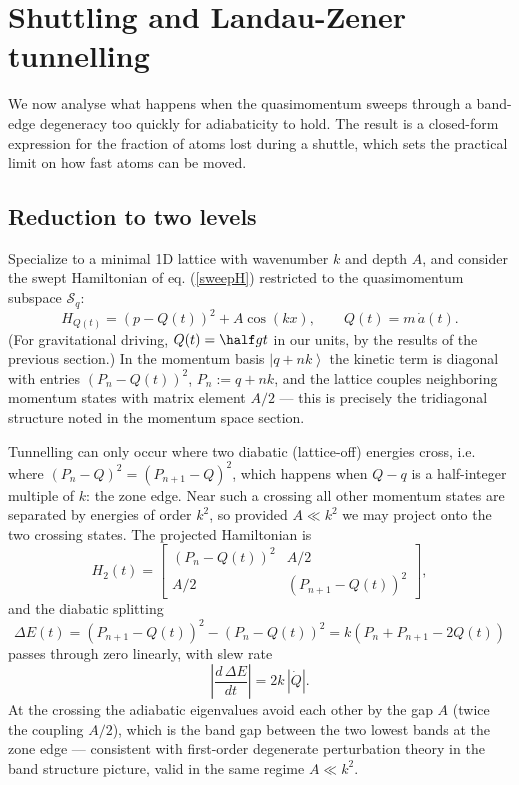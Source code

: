 
\section{Shuttling and Landau-Zener tunnelling}

We now analyse what happens when the quasimomentum sweeps through a
band-edge degeneracy too quickly for adiabaticity to hold.  The result is a
closed-form expression for the fraction of atoms lost during a shuttle,
which sets the practical limit on how fast atoms can be moved.

\subsection{Reduction to two levels}

Specialize to a minimal 1D lattice with wavenumber $k$ and depth $A$, and
consider the swept Hamiltonian of eq. (\ref{sweepH}) restricted to the
quasimomentum subspace $\mathcal{S}_q$:
$$H_{Q(t)} = \left(p - Q(t)\right)^2 + A\cos(kx), \qquad Q(t) = m\,\dot a(t).$$
(For gravitational driving, $Q(t) = \half g t$ in our units, by the results of
the previous section.)  In the momentum basis $\left|q + nk\right>$ the kinetic
term is diagonal with entries $\left(P_n - Q(t)\right)^2$, $P_n := q + nk$, and
the lattice couples neighboring momentum states with matrix element $A/2$ ---
this is precisely the tridiagonal structure noted in the momentum space section.

Tunnelling can only occur where two diabatic (lattice-off) energies cross, i.e.
where $\left(P_n - Q\right)^2 = \left(P_{n+1} - Q\right)^2$, which happens when
$Q - q$ is a half-integer multiple of $k$: the zone edge.  Near such a crossing
all other momentum states are separated by energies of order $k^2$, so provided
$A \ll k^2$ we may project onto the two crossing states.  The projected
Hamiltonian is
$$H_2(t) = \begin{bmatrix} \left(P_n - Q(t)\right)^2 & A/2 \\ A/2 &
\left(P_{n+1} - Q(t)\right)^2 \end{bmatrix},$$
and the diabatic splitting
$$\Delta E(t) = \left(P_{n+1}-Q(t)\right)^2 - \left(P_n-Q(t)\right)^2
= k\left(P_n + P_{n+1} - 2Q(t)\right)$$
passes through zero linearly, with slew rate
$$\left|\frac{d\,\Delta E}{dt}\right| = 2k\,|\dot Q|.$$
At the crossing the adiabatic eigenvalues avoid each other by the gap $A$
(twice the coupling $A/2$), which is the band gap between the two lowest bands
at the zone edge --- consistent with first-order degenerate perturbation theory
in the band structure picture, valid in the same regime $A \ll k^2$.

